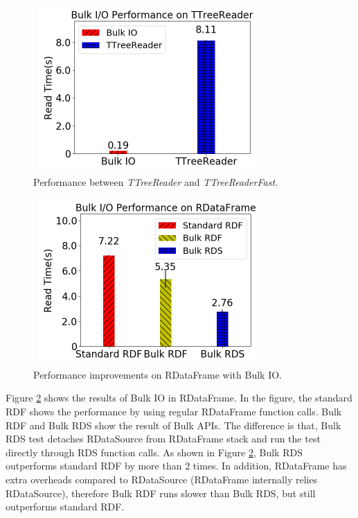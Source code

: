 \begin{figure}[!ht]
\centering
\includegraphics[height=2.5in, width=3.5in]{ttreereader.png}
\vspace*{-2mm}
\caption{Performance between \textit{TTreeReader} and \textit{TTreeReaderFast}.}
\label{fig:ttreereader}
\end{figure}

\begin{figure}[!ht]
\centering
\includegraphics[height=2.5in, width=3.5in]{dataframe.png}
\vspace*{-2mm}
\caption{Performance improvements on RDataFrame with Bulk IO.}
\label{fig:rdataframe}
\end{figure}

Figure \ref{fig:rdataframe} shows the results of Bulk IO in RDataFrame. In the figure, the standard RDF shows the performance by using regular RDataFrame function calls. Bulk RDF and Bulk RDS show the result of Bulk APIs. The difference is that, Bulk RDS test detaches RDataSource from RDataFrame stack and run the test directly through RDS function calls. As shown in Figure \ref{fig:rdataframe}, Bulk RDS outperforms standard RDF by more than 2 times. In addition, RDataFrame has extra overheads compared to RDataSource (RDataFrame internally relies RDataSource), therefore Bulk RDF runs slower than Bulk RDS, but still outperforms standard RDF.
